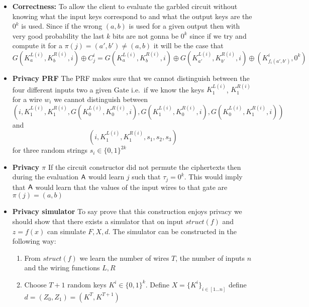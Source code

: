 \begin{itemize}
    \begin{itemize}
        \item \textbf{Correctness:} To allow the client to evaluate the garbled circuit without knowing what the input keys correspond to and what the output keys are the $0^k$ is used. Since if the wrong $(a,b)$ is used for a given output then with very good probability the last $k$ bits are not gonna be $0^k$ since if we try and compute it for a $\pi(j) = (a', b') \neq (a,b)$ it will be the case that
        \begin{equation*}
            G(K_a^{L(i)}, K_b^{R(i)}, i) \oplus C_j^i = G(K_a^{L(i)}, K_b^{R(i)}, i) \oplus G(K_{a'}^{L(i)}, K_{b'}^{R(i)}, i) \oplus (K_{f_i(a',b')}^i, 0^k)
        \end{equation*}
        \item \textbf{Privacy PRF} The PRF makes sure that we cannot distinguish between the four different inputs two a given Gate i.e.~if we know the keys $K_1^{L(i)}$, $K_1^{R(i)}$ for a wire $w_i$ we cannot distinguish between
        \begin{equation*}
            (i, K_1^{L(i)}, K_1^{R(i)}, G(K_0^{L(i)}, K_0^{R(i)}, i), G(K_1^{L(i)}, K_0^{R(i)}, i), G(K_0^{L(i)}, K_1^{R(i)}, i))
        \end{equation*}
        and
        \begin{equation*}
            (i, K_1^{L(i)}, K_1^{R(i)}, s_1, s_2, s_3)
        \end{equation*}
        for three random strings $s_i \in \{0,1\}^{2k}$
        \item \textbf{Privacy $\pi$} If the circuit constructor did not permute the ciphertexts then during the evaluation $\mathsf{A}$ would learn $j$ such that $\tau_j = 0^k$. This would imply that $\mathsf{A}$ would learn that the values of the input wires to that gate are $\pi(j) = (a,b)$
        \item \textbf{Privacy simulator} To say prove that this construction enjoys privacy we should show that there exists a simulator that on input $struct(f)$ and $z=f(x)$ can simulate $F,X,d$. The simulator can be constructed in the following way:
        \begin{enumerate}
            \item From $struct(f)$ we learn the number of wires $T$, the number of inputs $n$ and the wiring functions $L,R$
            \item Choose $T+1$ random keys $K^i \in \{0,1\}^k$. Define $X = \{K^i\}_{i \in [1 \dots n]}$ define $d = (Z_0, Z_1) = (K^T, K^{T+1})$

\end{enumerate}
\end{itemize}
\end{itemize}
